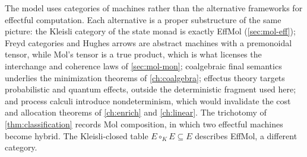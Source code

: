 \begin{remark}
The model uses categories of machines rather than the alternative
frameworks for effectful computation. Each alternative is a proper
substructure of the same picture: the Kleisli category of the state
monad is exactly EffMol (\autoref{sec:mol-eff}); Freyd categories and
Hughes arrows are abstract machines with a premonoidal tensor, while
Mol's tensor is a true product, which is what licenses the interchange
and coherence laws of \autoref{sec:mol-mon}; coalgebraic final
semantics underlies the minimization theorems of
\autoref{ch:coalgebra}; effectus theory targets probabilistic and
quantum effects, outside the deterministic fragment used here; and
process calculi introduce nondeterminism, which would invalidate the
cost and allocation theorems of \autoref{ch:enrich} and
\autoref{ch:linear}. The trichotomy of \autoref{thm:classification}
records Mol composition, in which two effectful machines become
hybrid. The Kleisli-closed table $E \circ_K E \subseteq E$ describes
EffMol, a different category.
\end{remark}
